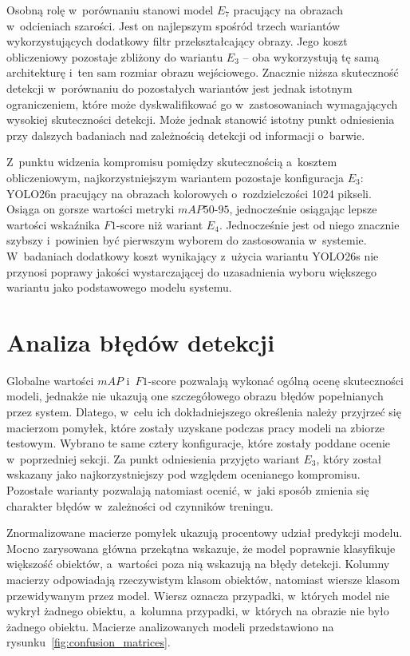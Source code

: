 Osobną rolę w~porównaniu stanowi model $E_7$ pracujący na obrazach w~odcieniach szarości. Jest on najlepszym spośród trzech wariantów wykorzystujących dodatkowy filtr przekształcający obrazy. Jego koszt obliczeniowy pozostaje zbliżony do wariantu $E_3$ -- oba wykorzystują tę samą architekturę i~ten sam rozmiar obrazu wejściowego. Znacznie niższa skuteczność detekcji w~porównaniu do pozostałych wariantów jest jednak istotnym ograniczeniem, które może dyskwalifikować go w~zastosowaniach wymagających wysokiej skuteczności detekcji. Może jednak stanowić istotny punkt odniesienia przy dalszych badaniach nad zależnością detekcji od informacji o~barwie.

Z~punktu widzenia kompromisu pomiędzy skutecznością a~kosztem obliczeniowym, najkorzystniejszym wariantem pozostaje konfiguracja $E_3$: YOLO26n pracujący na obrazach kolorowych o~rozdzielczości 1024 pikseli. Osiąga on gorsze wartości metryki $mAP50\text{-}95$, jednocześnie osiągając lepsze wartości wskaźnika $F1$-score niż wariant $E_4$. Jednocześnie jest od niego znacznie szybszy i~powinien być pierwszym wyborem do zastosowania w~systemie. W~badaniach dodatkowy koszt wynikający z~użycia wariantu YOLO26s nie przynosi poprawy jakości wystarczającej do uzasadnienia wyboru większego wariantu jako podstawowego modelu systemu.

\section{Analiza błędów detekcji}

Globalne wartości $mAP$ i~$F1$-score pozwalają wykonać ogólną ocenę skuteczności modeli, jednakże nie ukazują one szczegółowego obrazu błędów popełnianych przez system. Dlatego, w~celu ich dokładniejszego określenia należy przyjrzeć się macierzom pomyłek, które zostały uzyskane podczas pracy modeli na zbiorze testowym. Wybrano te same cztery konfiguracje, które zostały poddane ocenie w~poprzedniej sekcji. Za punkt odniesienia przyjęto wariant $E_3$, który został wskazany jako najkorzystniejszy pod względem ocenianego kompromisu. Pozostałe warianty pozwalają natomiast ocenić, w~jaki sposób zmienia się charakter błędów w~zależności od czynników treningu.

Znormalizowane macierze pomyłek ukazują procentowy udział predykcji modelu. Mocno zarysowana główna przekątna wskazuje, że model poprawnie klasyfikuje większość obiektów, a~wartości poza nią wskazują na błędy detekcji. Kolumny macierzy odpowiadają rzeczywistym klasom obiektów, natomiast wiersze klasom przewidywanym przez model. Wiersz  oznacza przypadki, w~których model nie wykrył żadnego obiektu, a~kolumna  przypadki, w~których na obrazie nie było żadnego obiektu. Macierze analizowanych modeli przedstawiono na rysunku~\ref{fig:confusion_matrices}.

